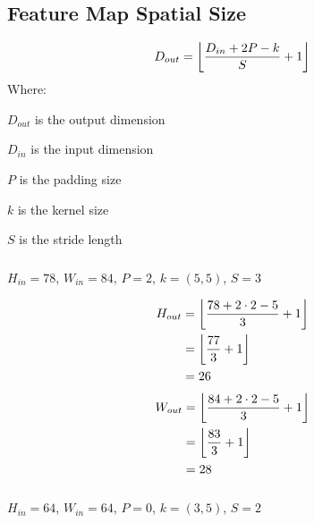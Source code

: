 \documentclass[9pt]{paper}
\DeclarePairedDelimiter\floor{\lfloor}{\rfloor}
\begin{document}
\subsection{Feature Map Spatial Size}
\begin{equation}
	D_{out} = \floor*{\frac{D_{in} + 2P - k}{S} + 1}
\end{equation}
Where:
\begin{description}
\item $D_{out}$ is the output dimension
\item $D_{in}$ is the input dimension
\item $P$ is the padding size
\item $k$ is the kernel size
\item $S$ is the stride length
\end{description}
\subsubsection{}
\begin{multicols}{5}
$H_{in}=78$,\break
$W_{in}=84$,\break
$P=2$,\break
$k=(5, 5)$,\break
$S=3$
\end{multicols}
\begin{multicols}{2}
\begin{equation*}
\begin{split}
	H_{out} &= \floor*{\frac{78 + 2\cdot2 - 5}{3} + 1}\\
		&= \floor*{\frac{77}{3} + 1}\\
		&=26
\end{split}
\end{equation*}\break
\begin{equation*}
\begin{split}
	W_{out} &= \floor*{\frac{84 + 2\cdot2 - 5 }{3} + 1}\\
		&= \floor*{\frac{83}{3} + 1}\\
		&=28
\end{split}
\end{equation*}	
\end{multicols}

\subsubsection{}
\begin{multicols}{5}
$H_{in}=64$,\break
$W_{in}=64$,\break
$P=0$,\break
$k=(3, 5)$,\break
$S=2$
\end{multicols}
\end{document}
